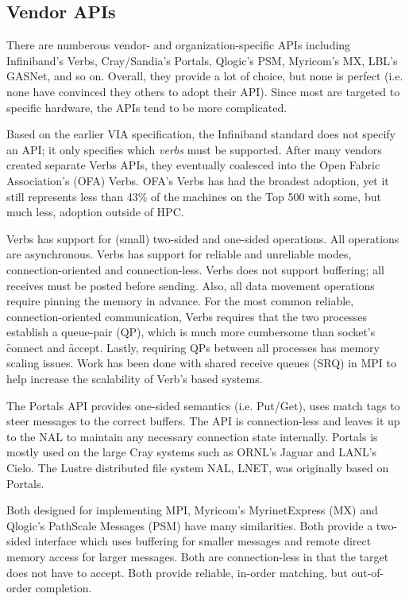 \documentclass[conference]{IEEEtran}
\begin{document}
\subsection{Vendor APIs} There are numberous vendor- and organization-specific APIs
including Infiniband's Verbs\cite{ofa-verbs}, Cray/Sandia's Portals\cite{portals}, Qlogic's
PSM\cite{psm}, Myricom's MX\cite{mx}, LBL's GASNet\cite{gasnet}, and so on.  Overall, they
provide a lot of choice, but none is perfect (i.e. none have convinced they others to
adopt their API).  Since most are targeted to specific hardware, the APIs tend to be more
complicated.

Based on the earlier VIA specification\cite{via}, the Infiniband standard does not specify
an API; it only specifies which \emph{verbs} must be supported. After many vendors created
separate Verbs APIs, they eventually coalesced into the Open Fabric Association's (OFA)
Verbs. OFA's Verbs has had the broadest adoption, yet it still represents less than 43\%
of the machines on the Top 500\cite{top500} with some, but much less, adoption outside of
HPC.

Verbs has support for (small) two-sided and one-sided operations. All operations are
asynchronous. Verbs has support for reliable and unreliable modes, connection-oriented
and connection-less. Verbs does not support buffering; all receives must be posted before
sending. Also, all data movement operations require pinning the memory in advance. For the
most common reliable, connection-oriented communication, Verbs requires that the two
processes establish a queue-pair (QP), which is much more cumbersome than socket's
\f{connect} and \f{accept}. Lastly, requiring QPs between all processes has memory scaling
issues. Work has been done with shared receive queues (SRQ) in MPI\cite{srq} to help
increase the scalability of Verb's based systems.

The Portals API provides one-sided semantics (i.e.  Put/Get), uses match tags to steer
messages to the correct buffers. The API is connection-less and leaves it up to the NAL to
maintain any necessary connection state internally. Portals is mostly used on the large
Cray systems such as ORNL's Jaguar\cite{jaguar} and LANL's Cielo\cite{cielo}.  The
Lustre distributed file system NAL, LNET, was originally based on Portals\cite{lnet}.

Both designed for implementing MPI, Myricom's MyrinetExpress (MX) and Qlogic's PathScale
Messages (PSM) have many similarities. Both provide a two-sided interface which uses
buffering for smaller messages and remote direct memory access for larger messages.  Both
are connection-less in that the target does not have to accept.  Both provide reliable,
in-order matching, but out-of-order completion.
\end{document}
